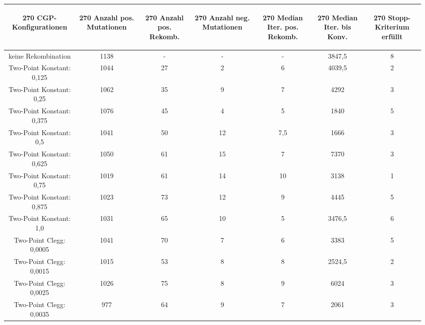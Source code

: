 \begin{table}[H]
	\centering
	\begin{tabular}{c | c | c | c | c | c | c}
		\begin{turn}{270} \textbf{CGP-Konfigurationen} \end{turn} & \begin{turn}{270} \textbf{Anzahl pos. Mutationen} \end{turn} & \begin{turn}{270} \textbf{Anzahl pos. Rekomb.} \end{turn} & \begin{turn}{270} \textbf{Anzahl neg. Mutationen} \end{turn} & \begin{turn}{270} \textbf{Median Iter. pos. Rekomb.} \end{turn} & \begin{turn}{270} \textbf{Median Iter. bis Konv.} \end{turn} & \begin{turn}{270} \textbf{Stopp-Kriterium erfüllt} \end{turn}\\
		\hline
		keine Rekombination & 1138 & - & - & - & 3847,5 & 8\\
		\hline
		Two-Point Konstant: 0,125 & 1044 & 27 & 2 & 6 & 4039,5 & 2\\
		\hline
		Two-Point Konstant: 0,25 & 1062 & 35 & 9 & 7 & 4292 & 3\\
		\hline
		Two-Point Konstant: 0,375 & 1076 & 45 & 4 & 5 & 1840 & 5\\
		\hline
		Two-Point Konstant: 0,5 & 1041 & 50 & 12 & 7,5 & 1666 & 3\\
		\hline
		Two-Point Konstant: 0,625 & 1050 & 61 & 15 & 7 & 7370 & 3\\
		\hline
		Two-Point Konstant: 0,75 & 1019 & 61 & 14 & 10 & 3138 & 1\\
		\hline
		Two-Point Konstant: 0,875 & 1023 & 73 & 12 & 9 & 4445 & 5\\
		\hline
		Two-Point Konstant: 1,0 & 1031 & 65 & 10 & 5 & 3476,5 & 6\\
		\hline
		Two-Point Clegg: 0,0005 & 1041 & 70 & 7 & 6 & 3383 & 5\\
		\hline
		Two-Point Clegg: 0,0015 & 1015 & 53 & 8 & 8 & 2524,5 & 2\\
		\hline
		Two-Point Clegg: 0,0025 & 1026 & 75 & 8 & 9 & 6024 & 3\\
		\hline
		Two-Point Clegg: 0,0035 & 977 & 64 & 9 & 7 & 2061 & 3\\

\end{tabular}
\end{table}
